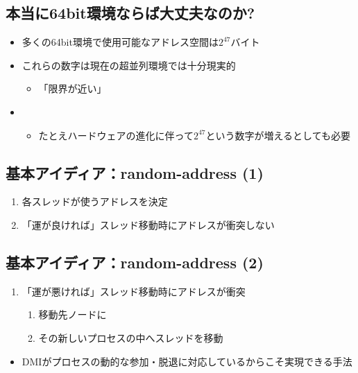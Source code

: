 \documentclass[25pt,papersize,landscape]{jsarticle}
\begin{document}

\subsection{本当に64bit環境ならば大丈夫なのか?}

\begin{itemize}
\item 多くの64bit環境で使用可能なアドレス空間は$2^{47}$バイト
\end{itemize}
\begin{itemize}
\item これらの数字は現在の超並列環境では十分現実的
  \begin{itemize}
  \item 「限界が近い」
  \end{itemize}
\item {}
  \begin{itemize}
  \item たとえハードウェアの進化に伴って$2^{47}$という数字が増えるとしても必要
  \end{itemize}
\end{itemize}

\subsection{基本アイディア：random-address (1)}

\begin{enumerate}
\item 各スレッドが使うアドレスを決定
\item 「運が良ければ」スレッド移動時にアドレスが衝突しない
\end{enumerate}


\subsection{基本アイディア：random-address (2)}

\begin{enumerate}
\item 「運が悪ければ」スレッド移動時にアドレスが衝突
  \begin{enumerate}
  \item 移動先ノードに
  \item その新しいプロセスの中へスレッドを移動
  \end{enumerate}
\end{enumerate}
\begin{itemize}
\item DMIがプロセスの動的な参加・脱退に対応しているからこそ実現できる手法
\end{itemize}
\end{document}
